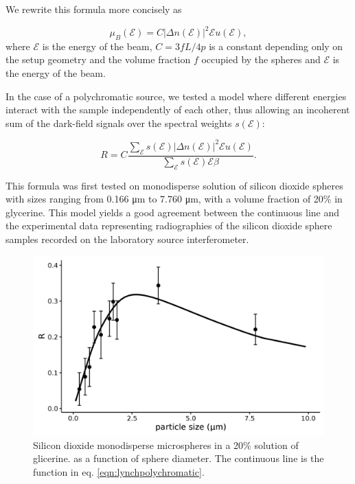 \documentclass[preprint,12pt]{elsarticle}
\newcommand{\energy}{\mathcal{E}}
\begin{document}
We rewrite this formula more concisely as

\begin{equation}
    \mu_B(\energy) = C |\Delta n(\energy)|^2 \energy u(\energy),
    \label{eqn:lynchshort}
\end{equation}
where $\energy$ is the energy of the beam, $C = 3 fL / 4p$ is a constant
depending only on the setup geometry and the volume fraction $f$ occupied by
the spheres and $\energy$ is the energy of the beam.


In the case of a polychromatic source, we tested a model where different
energies interact with the sample independently of each other, thus allowing
an incoherent sum of the dark-field signals over the spectral weights
$s(\energy)$:

\begin{equation}
    R = C \frac{\sum_\energy s(\energy)|\Delta n(\energy)|^2 \energy u(\energy)}{\sum_\energy s(\energy) \energy \beta}.
    \label{eqn:lynchpolychromatic}
\end{equation}

This formula was first tested on monodisperse solution of silicon dioxide
spheres with sizes ranging from 0.166 μm to 7.760 μm, with a volume fraction of 20\%
in glycerine. This model yields a good agreement between the continuous line
and the experimental data representing radiographies of the silicon dioxide
sphere samples recorded on the laboratory source interferometer.
\begin{figure}[h!]
\begin{center}
\includegraphics[width=0.70\columnwidth]{figures/summary/summary}
\caption{{Silicon dioxide monodisperse microspheres in a 20\% solution of
glicerine. as a function of sphere diameter. The continuous line is the
function in eq. {\ref{eqn:lynchpolychromatic}}.
{\label{725462}}%
}}
\end{center}
\end{figure}
\end{document}
